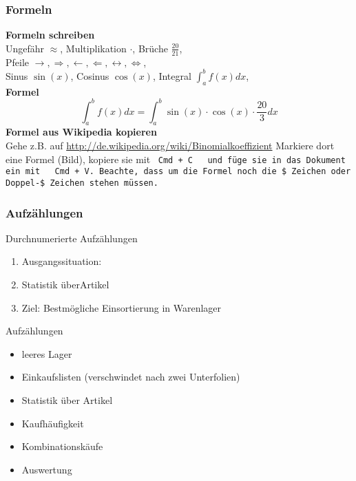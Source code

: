 \documentclass[18pt]{beamer}
\begin{document}
\begin{frame}[t]
	\frametitle{Formeln}
	
	{\bf Formeln schreiben} \\
	Ungefähr $\approx$, Multiplikation $\cdot$, Brüche $\frac{20}{21}$, \\
	Pfeile $\rightarrow, \Rightarrow, \leftarrow, \Leftarrow, \leftrightarrow, \Leftrightarrow$, \\
	Sinus $\sin(x)$, Cosinus $\cos(x)$, Integral $\int_a^b f(x) dx$,
	\\[5mm]
	{\bf Formel}
	$$
		\int_{a}^{b} f(x) dx = \int_{a}^{b} \sin(x) \cdot \cos(x) \cdot \frac{20}{3} dx
	$$
	{\bf Formel aus Wikipedia kopieren}\\
	Gehe z.B. auf	\url{http://de.wikipedia.org/wiki/Binomialkoeffizient}
	Markiere dort eine Formel (Bild), kopiere sie mit \, \tt{Cmd + C} \, und füge sie in das Dokument ein mit \, \tt{Cmd + V}.
	Beachte, dass um die Formel noch die \$ Zeichen oder Doppel-\$ Zeichen stehen müssen.
\end{frame}



\begin{frame}[t]
\frametitle{Aufzählungen}
	Durchnumerierte Aufzählungen
	\large
	\begin{enumerate}
		\item<1-> Ausgangssituation: 
		\item<2-> Statistik überArtikel
		\item<3-> Ziel: Bestmögliche Einsortierung in Warenlager
	\end{enumerate}
	\vspace*{1cm}
	Aufzählungen
	\begin{itemize}
		\item<4-> leeres Lager
		\item<5-6> Einkaufslisten {\color{red} (verschwindet nach zwei Unterfolien)}
		\item<6-> Statistik über Artikel
		\item<6-> Kaufhäufigkeit
		\item<7-> Kombinationskäufe
		\item<8-> Auswertung
	\end{itemize}						
\end{frame}
\end{document}
